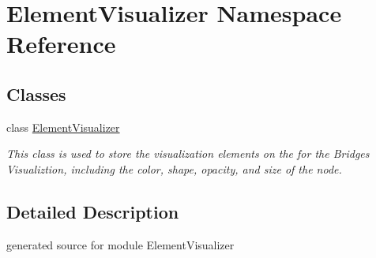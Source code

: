 \hypertarget{namespace_element_visualizer}{}\section{Element\+Visualizer Namespace Reference}
\label{namespace_element_visualizer}
\subsection*{Classes}
\begin{DoxyCompactItemize}
\item 
class \hyperlink{class_element_visualizer_1_1_element_visualizer}{Element\+Visualizer}
\begin{DoxyCompactList}\small\item\em This class is used to store the visualization elements on the for the Bridges Visualiztion, including the color, shape, opacity, and size of the node. \end{DoxyCompactList}\end{DoxyCompactItemize}


\subsection{Detailed Description}
\begin{DoxyVerb}generated source for module ElementVisualizer \end{DoxyVerb}
 